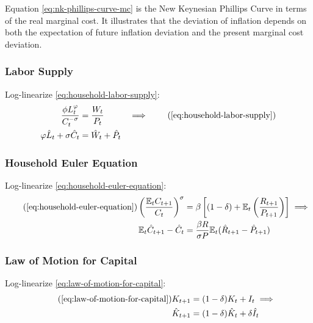 \documentclass[
thesis.tex
]{subfiles}
\begin{document}
	Equation \ref{eq:nk-phillips-curve-mc} is the New Keynesian Phillips Curve in terms of the real marginal cost. It illustrates that the deviation of inflation depends on both the expectation of future inflation deviation and the present marginal cost deviation.
	
	
	\subsubsection*{Labor Supply}
	
	Log-linearize \ref{eq:household-labor-supply}:
	\begin{alignat}{2}
		\frac{\phi L_t^{\varphi}}{C_t^{-\sigma}} &= \frac{W_t}{P_t} & \implies \tag{\ref{eq:household-labor-supply}} \\
		\varphi \hat{L}_t + \sigma \hat{C}_t &= \hat{W}_t + \hat{P}_t & \label{eq:ll-labor-supply}
	\end{alignat}
	
	
	\subsubsection*{Household Euler Equation}
	
	Log-linearize \ref{eq:household-euler-equation}:
	\begin{align}
		\tag{\ref{eq:household-euler-equation}}
		\left( \frac{\mathbb{E}_t C_{t+1}}{C_t} \right)^\sigma &= \beta \left[ (1-\delta) + \mathbb{E}_t \left(\frac{R_{t+1}}{P_{t+1}}\right) \right] \implies \\
		\label{eq:ll-household-euler-equation}
		\E \hat{C}_{t+1} - \hat{C}_t &= \frac{\beta R}{\sigma P} \E(\hat{R}_{t+1} - \hat{P}_{t+1})
	\end{align}
	
	
	\subsubsection*{Law of Motion for Capital}
	
	Log-linearize \ref{eq:law-of-motion-for-capital}:
	\begin{align}
		\tag{\ref{eq:law-of-motion-for-capital}}
		K_{t+1} &= (1-\delta)K_t + I_t \implies \\
		\label{eq:ll-law-of-motion-for-capital}
		\hat{K}_{t+1} &= (1-\delta)\hat{K}_t + \delta \hat{I}_t
	\end{align}
	
\end{document}
